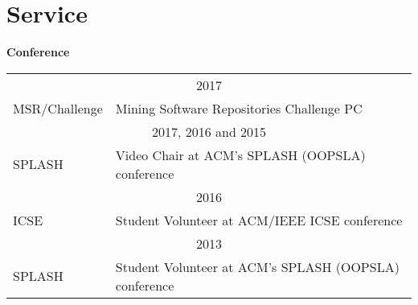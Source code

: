\documentclass[10pt]{article}
\begin{document}
\begin{comment}
\halfblankline

\href{http://www.sikorsky.com/}{\textbf{Sikorsky Aircraft}},
New York, NY%
\begin{outerlist}

\item[] \textit{Intern, Operations Analysis}%
        \hfill \textbf{May 2007 to August 2007}
\begin{innerlist}\vspace{-4pt}
\item Lead programmer in a team creating a simulator for natural and terrorist disaster response
\end{innerlist}
\end{outerlist}
\end{comment}




\vspace{-8pt}
\section{Service}




\vspace{10pt}
\textbf{Conference}\\
\vspace{-10pt}
\noindent\begin{tabular}{p{2.5cm}p{10.5cm}}
\multicolumn{2}{c}{2017}\\
MSR/Challenge & Mining Software Repositories Challenge PC\\
\multicolumn{2}{c}{2017, 2016 and 2015}\\
SPLASH &Video Chair at ACM's SPLASH (OOPSLA) conference\\
\multicolumn{2}{c}{2016}\\
ICSE &Student Volunteer at ACM/IEEE ICSE conference\\
\multicolumn{2}{c}{2013}\\
SPLASH &Student Volunteer at ACM's SPLASH (OOPSLA) conference\\
\end{tabular}\\
\end{document}
